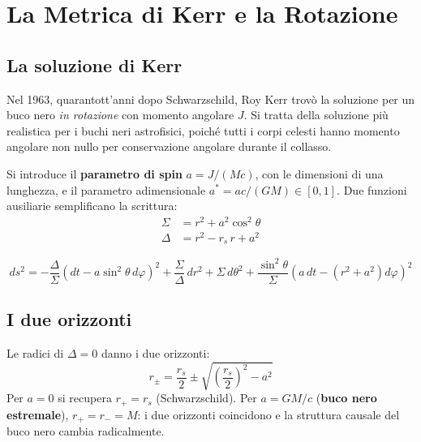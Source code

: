\documentclass[12pt, a4paper, twoside]{article}
\newenvironment{physbox}[1]{%
  \begin{tcolorbox}[equationbox, title={#1}]
}{%
  \end{tcolorbox}
}
\theoremstyle{definition}
\newcommand{\RS}{r_{\!s}}          %
\begin{document}
\newpage

\section{La Metrica di Kerr e la Rotazione}

\subsection{La soluzione di Kerr}

Nel 1963, quarantott'anni dopo Schwarzschild, Roy Kerr trovò la soluzione per
un buco nero \emph{in rotazione} con momento angolare $J$. Si tratta della
soluzione più realistica per i buchi neri astrofisici, poiché tutti i corpi
celesti hanno momento angolare non nullo per conservazione angolare durante
il collasso.

Si introduce il \textbf{parametro di spin} $a = J/(Mc)$, con le dimensioni
di una lunghezza, e il parametro adimensionale $a^* = ac/(GM) \in [0, 1]$.
Due funzioni ausiliarie semplificano la scrittura:
\begin{align}
  \Sigma &= r^2 + a^2\cos^2\theta \\
  \Delta &= r^2 - \RS\, r + a^2
\end{align}

\begin{physbox}{Metrica di Kerr (coordinate di Boyer-Lindquist)}
\begin{equation}
  ds^2 = -\frac{\Delta}{\Sigma}\!\left(dt - a\sin^2\!\theta\, d\varphi\right)^2
        + \frac{\Sigma}{\Delta}\,dr^2
        + \Sigma\, d\theta^2
        + \frac{\sin^2\!\theta}{\Sigma}\!\left(a\,dt - (r^2+a^2)d\varphi\right)^2
  \label{eq:kerr}
\end{equation}
\end{physbox}

\subsection{I due orizzonti}

Le radici di $\Delta = 0$ danno i due orizzonti:
\begin{equation}
  r_\pm = \frac{\RS}{2} \pm \sqrt{\left(\frac{\RS}{2}\right)^2 - a^2}
\end{equation}
Per $a = 0$ si recupera $r_+ = \RS$ (Schwarzschild). Per $a = GM/c$
(\textbf{buco nero estremale}), $r_+ = r_- = M$: i due orizzonti coincidono
e la struttura causale del buco nero cambia radicalmente.
\end{document}
